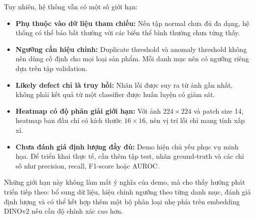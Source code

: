 Tuy nhiên, hệ thống vẫn có một số giới hạn:

\begin{itemize}
    \item \textbf{Phụ thuộc vào dữ liệu tham chiếu:} Nếu tập normal chưa đủ đa dạng, hệ thống có thể báo bất thường với các biến thể bình thường chưa từng thấy.
    \item \textbf{Ngưỡng cần hiệu chỉnh:} Duplicate threshold và anomaly threshold không nên dùng cố định cho mọi loại sản phẩm. Mỗi danh mục nên có ngưỡng riêng dựa trên tập validation.
    \item \textbf{Likely defect chỉ là truy hồi:} Nhãn lỗi được suy ra từ ảnh gần nhất, không phải kết quả từ một classifier được huấn luyện có giám sát.
    \item \textbf{Heatmap có độ phân giải giới hạn:} Với ảnh $224 \times 224$ và patch size 14, heatmap ban đầu chỉ có kích thước $16 \times 16$, nên vị trí lỗi chỉ mang tính xấp xỉ.
    \item \textbf{Chưa đánh giá định lượng đầy đủ:} Demo hiện chủ yếu phục vụ minh họa. Để triển khai thực tế, cần thêm tập test, nhãn ground-truth và các chỉ số như precision, recall, F1-score hoặc AUROC.
\end{itemize}

Những giới hạn này không làm mất ý nghĩa của demo, mà cho thấy hướng phát triển tiếp theo: bổ sung dữ liệu, hiệu chỉnh ngưỡng theo từng danh mục, đánh giá định lượng và có thể kết hợp thêm một bộ phân loại nhẹ phía trên embedding DINOv2 nếu cần độ chính xác cao hơn.
